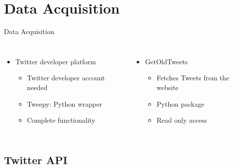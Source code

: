 \documentclass{beamer}
\begin{document}
\section{Data Acquisition}

\begin{frame}{Data Acquisition}
\begin{columns}
\begin{itemize}
\item Twitter developer platform
	\begin{itemize}
	\item Twitter developer account needed
	\item Tweepy: Python wrapper
	\item Complete functionality
	\end{itemize}
\end{itemize}
\vspace{0.5cm}
\pause
{}
\begin{itemize}
\item GetOldTweets
	\begin{itemize}
	\item Fetches Tweets from the website
	\item Python package
	\item Read only access
	\end{itemize}
\end{itemize}
\vspace{0.5cm}
\end{columns}
\end{frame}

\subsection{Twitter API}
\end{document}
